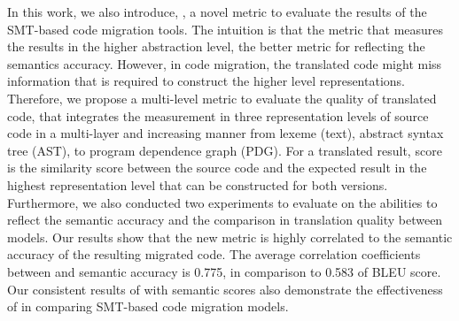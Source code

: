 

In this work, we also introduce, {\model}, a novel metric to evaluate
the results of the SMT-based code migration tools. The intuition is
that the metric that measures the results in the higher abstraction
level, the better metric for reflecting the semantics
accuracy. However, in code migration, the translated code might miss
information that is required to construct the higher level
representations. Therefore, we propose a multi-level metric to
evaluate the quality of translated code, that integrates the
measurement in three representation levels of source code in a
multi-layer and increasing manner from lexeme (text), abstract syntax
tree (AST), to program dependence graph (PDG). For a translated
result, {\model} score is the similarity score between the source code
and the expected result in the highest representation level that can
be constructed for both versions. Furthermore,
we also conducted two experiments to evaluate {\model} on the abilities to
reflect the semantic accuracy and the comparison in translation quality
between models. Our results show that the new metric {\model} is
highly correlated to the semantic accuracy of the resulting migrated
code. The average correlation coefficients between {\model} and
semantic accuracy is 0.775, in comparison to 0.583 of BLEU score.  Our
consistent results of {\model} with semantic scores also demonstrate
the effectiveness of {\model} in comparing SMT-based code migration
models.

